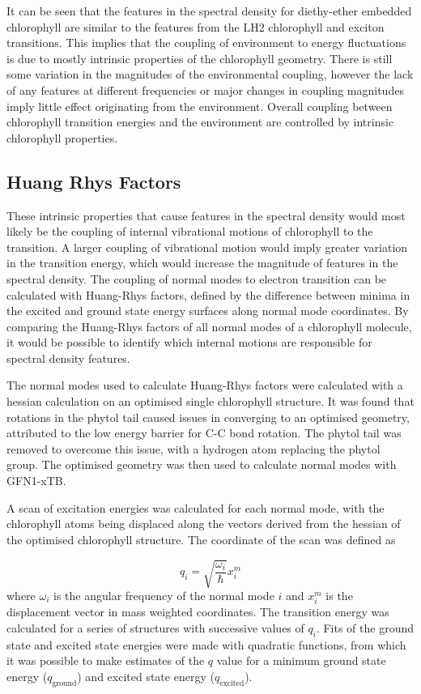 It can be seen that the features in the spectral density for diethy-ether embedded
chlorophyll are similar to the features from the LH2 chlorophyll and exciton transitions.
This implies that the coupling of environment to energy fluctuations is due to mostly
intrinsic properties of the chlorophyll geometry. There is still some variation 
in the magnitudes of the environmental coupling, however the lack of any features
at different frequencies or major changes in coupling magnitudes imply little effect
originating from the environment. Overall coupling between chlorophyll transition
energies and the environment are controlled by intrinsic chlorophyll properties.

\subsection{Huang Rhys Factors}
\label{subsec:hrf}

These intrinsic properties that cause features in the spectral density would most
likely be the coupling of internal vibrational motions of chlorophyll to the \Qy transition. 
A larger coupling of vibrational motion would imply greater variation in the \Qy 
transition energy, which would increase the magnitude of features in the spectral
density. The coupling of normal modes to electron transition can be calculated with
Huang-Rhys factors, defined by the difference between minima in the excited and
ground state energy surfaces along normal mode coordinates. By comparing the Huang-Rhys
factors of all normal modes of a chlorophyll molecule, it would be possible to identify
which internal motions are responsible for spectral density features.

The normal modes used to calculate Huang-Rhys factors were calculated with a hessian
calculation on an optimised single chlorophyll structure. It was found that rotations
in the phytol tail caused issues in converging to an optimised geometry, attributed
to the low energy barrier for C-C bond rotation. The phytol tail was removed to
overcome this issue, with a hydrogen atom replacing the phytol group. The optimised
geometry was then used to calculate normal modes with GFN1-xTB.

A scan of excitation energies was calculated for each normal mode, with the chlorophyll
atoms being displaced along the vectors derived from the hessian of the optimised
chlorophyll structure. The coordinate of the scan was defined as 

\begin{equation}
    q_i = \sqrt{\frac{\omega_i}{\hbar}} x^m_i
\end{equation}
%
where $\omega_i$ is the angular frequency of the normal mode $i$ and $x^m_i$ is
the displacement vector in mass weighted coordinates. The \Qy transition energy 
was calculated for a series of structures with successive values of $q_i$. Fits 
of the ground state and excited state energies were made with quadratic functions,
from which it was possible to make estimates of the $q$ value for a minimum ground
state energy ($q_{\text{ground}}$) and excited state energy ($q_{\text{excited}}$).

